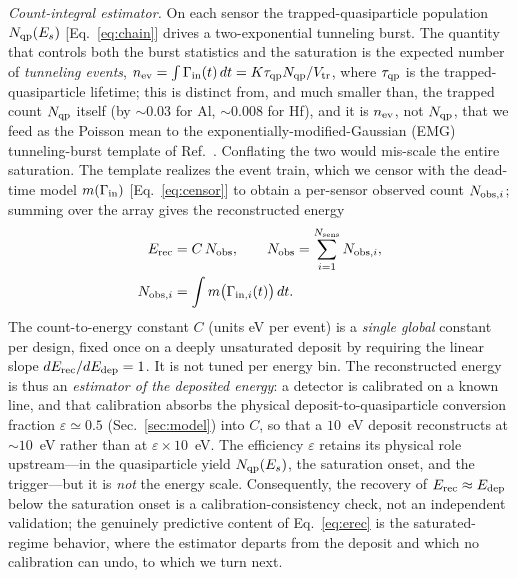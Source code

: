 \emph{Count-integral estimator.} On each sensor the trapped-quasiparticle population $N_{\rm qp}(E_s)$ [Eq.~\eqref{eq:chain}] drives a two-exponential tunneling burst. The quantity that controls both the burst statistics and the saturation is the expected number of \emph{tunneling events}, $n_{\rm ev}=\int\Gamma_{\rm in}(t)\,dt=K\tau_{\rm qp}N_{\rm qp}/V_{\rm tr}$, where $\tau_{\rm qp}$ is the trapped-quasiparticle lifetime; this is distinct from, and much smaller than, the trapped count $N_{\rm qp}$ itself (by $\sim$$0.03$ for Al, $\sim$$0.008$ for Hf), and it is $n_{\rm ev}$, not $N_{\rm qp}$, that we feed as the Poisson mean to the exponentially-modified-Gaussian (EMG) tunneling-burst template of Ref.~\cite{ramanathan2026}. Conflating the two would mis-scale the entire saturation. The template realizes the event train, which we censor with the dead-time model $m(\Gamma_{\rm in})$ [Eq.~\eqref{eq:censor}] to obtain a per-sensor observed count $N_{{\rm obs},i}$; summing over the array gives the reconstructed energy
\begin{equation}
\begin{aligned}
E_{\rm rec}&=C\,N_{\rm obs},\qquad
N_{\rm obs}=\sum_{i=1}^{N_{\rm sens}} N_{{\rm obs},i},\\
N_{{\rm obs},i}&=\int m\big(\Gamma_{{\rm in},i}(t)\big)\,dt .
\end{aligned}
\label{eq:erec}
\end{equation}
The count-to-energy constant $C$ (units eV per event) is a \emph{single global} constant per design, fixed once on a deeply unsaturated deposit by requiring the linear slope $dE_{\rm rec}/dE_{\rm dep}=1$. It is not tuned per energy bin. The reconstructed energy is thus an \emph{estimator of the deposited energy}: a detector is calibrated on a known line, and that calibration absorbs the physical deposit-to-quasiparticle conversion fraction $\varepsilon\simeq0.5$ (Sec.~\ref{sec:model}) into $C$, so that a $10$~eV deposit reconstructs at $\sim$$10$~eV rather than at $\varepsilon\times10$~eV. The efficiency $\varepsilon$ retains its physical role upstream---in the quasiparticle yield $N_{\rm qp}(E_s)$, the saturation onset, and the trigger---but it is \emph{not} the energy scale. Consequently, the recovery of $E_{\rm rec}\approx E_{\rm dep}$ below the saturation onset is a calibration-consistency check, not an independent validation; the genuinely predictive content of Eq.~\eqref{eq:erec} is the saturated-regime behavior, where the estimator departs from the deposit and which no calibration can undo, to which we turn next.

